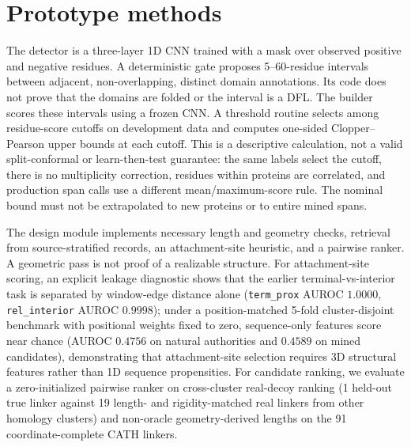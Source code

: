 \documentclass{article}
\begin{document}
\section{Prototype methods}
The detector is a three-layer 1D CNN trained with a mask over observed positive and negative residues. A deterministic gate proposes 5--60-residue intervals between adjacent, non-overlapping, distinct domain annotations. Its code does not prove that the domains are folded or the interval is a DFL. The builder scores these intervals using a frozen CNN. A threshold routine selects among residue-score cutoffs on development data and computes one-sided Clopper--Pearson upper bounds at each cutoff. This is a descriptive calculation, not a valid split-conformal or learn-then-test guarantee: the same labels select the cutoff, there is no multiplicity correction, residues within proteins are correlated, and production span calls use a different mean/maximum-score rule. The nominal bound must not be extrapolated to new proteins or to entire mined spans.

The design module implements necessary length and geometry checks, retrieval from source-stratified records, an attachment-site heuristic, and a pairwise ranker. A geometric pass is not proof of a realizable structure. For attachment-site scoring, an explicit leakage diagnostic shows that the earlier terminal-vs-interior task is separated by window-edge distance alone (\texttt{term\_prox} AUROC $1.0000$, \texttt{rel\_interior} AUROC $0.9998$); under a position-matched 5-fold cluster-disjoint benchmark with positional weights fixed to zero, sequence-only features score near chance (AUROC $0.4756$ on natural authorities and $0.4589$ on mined candidates), demonstrating that attachment-site selection requires 3D structural features rather than 1D sequence propensities. For candidate ranking, we evaluate a zero-initialized pairwise ranker on cross-cluster real-decoy ranking (1 held-out true linker against 19 length- and rigidity-matched real linkers from other homology clusters) and non-oracle geometry-derived lengths on the 91 coordinate-complete CATH linkers.
\end{document}
